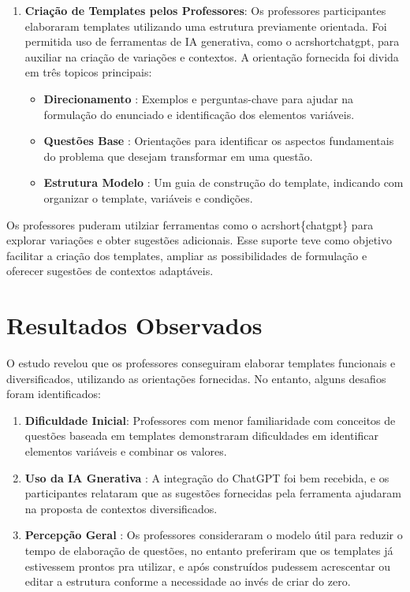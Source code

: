 \begin{enumerate}
    \item \textbf{Criação de Templates pelos Professores}:  Os professores participantes elaboraram templates utilizando uma estrutura previamente orientada. Foi permitida uso de ferramentas de IA generativa, como o acrshort{chatgpt}, para auxiliar na criação de variações e contextos. A orientação fornecida foi divida em três topicos principais:
    \begin{itemize}
        \item \textbf{Direcionamento} : Exemplos e perguntas-chave para ajudar na formulação do enunciado e identificação dos elementos variáveis.
        \item \textbf{Questões Base} : Orientações para identificar os aspectos fundamentais do problema que desejam transformar em uma questão.
        \item \textbf{Estrutura Modelo} : Um guia de construção do template, indicando com organizar o template, variáveis e condições.
    \end{itemize}
\end{enumerate}

Os professores puderam utilziar ferramentas como o  acrshort\{chatgpt\} para explorar variações e obter sugestões adicionais. Esse suporte teve como objetivo facilitar a criação dos templates, ampliar as possibilidades de formulação e oferecer sugestões de contextos adaptáveis.






\section{Resultados Observados}

O estudo revelou que os professores conseguiram elaborar templates funcionais e diversificados, utilizando as orientações fornecidas. No entanto, alguns desafios foram identificados:

\begin{enumerate}
    \item \textbf{Dificuldade Inicial}: Professores com menor familiaridade com conceitos de questões baseada em templates demonstraram dificuldades em identificar elementos variáveis e combinar os valores.
    \item \textbf{Uso da IA Gnerativa} : A integração do ChatGPT foi bem recebida, e os participantes relataram que as sugestões fornecidas pela ferramenta ajudaram na proposta de contextos diversificados.
    \item \textbf{Percepção Geral} : Os professores consideraram o modelo útil para reduzir o tempo de elaboração de questões, no entanto preferiram que os templates já estivessem prontos pra utilizar, e após construídos pudessem acrescentar ou editar a estrutura conforme a necessidade ao invés de criar do zero.
\end{enumerate}

